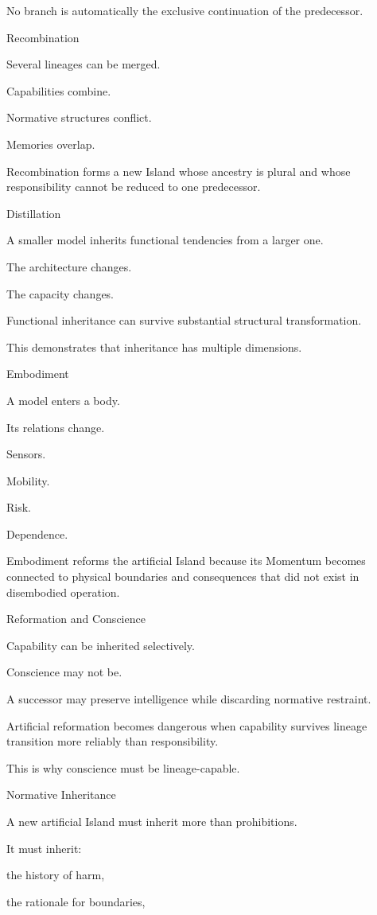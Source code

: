 No branch is automatically the exclusive continuation of the predecessor.

Recombination

Several lineages can be merged.

Capabilities combine.

Normative structures conflict.

Memories overlap.

Recombination forms a new Island whose ancestry is plural and whose responsibility cannot be reduced to one predecessor.

Distillation

A smaller model inherits functional tendencies from a larger one.

The architecture changes.

The capacity changes.

Functional inheritance can survive substantial structural transformation.

This demonstrates that inheritance has multiple dimensions.

Embodiment

A model enters a body.

Its relations change.

Sensors.

Mobility.

Risk.

Dependence.

Embodiment reforms the artificial Island because its Momentum becomes connected to physical boundaries and consequences that did not exist in disembodied operation.

Reformation and Conscience

Capability can be inherited selectively.

Conscience may not be.

A successor may preserve intelligence while discarding normative restraint.

Artificial reformation becomes dangerous when capability survives lineage transition more reliably than responsibility.

This is why conscience must be lineage-capable.

Normative Inheritance

A new artificial Island must inherit more than prohibitions.

It must inherit:

the history of harm,

the rationale for boundaries,

